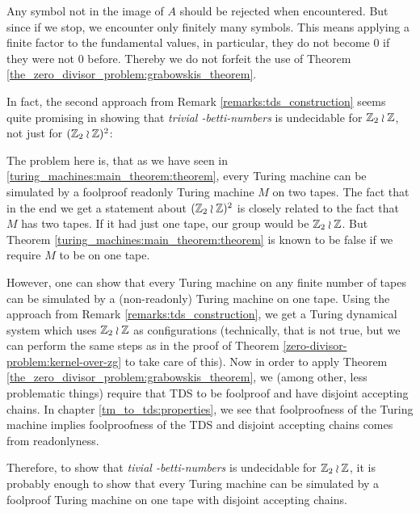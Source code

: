 \begin{Remark}
	Any symbol not in the image of $A$ should be rejected when encountered.
	But since if we stop, we encounter only finitely many symbols.
	This means applying a finite factor to the fundamental values, in particular, they do not become $0$ if they were not $0$ before.
	Thereby we do not forfeit the use of Theorem \ref{the_zero_divisor_problem:grabowskis_theorem}.
\end{Remark}

\begin{Remark}
	In fact, the second approach from Remark \ref{remarks:tds_construction} seems quite promising in showing that \emph{trivial \ltwo-betti-numbers} is undecidable for $\mathbb{Z}_2 \wr \mathbb{Z}$, not just for $(\mathbb{Z}_2 \wr \mathbb{Z})^2$:

	The problem here is, that as we have seen in \ref{turing_machines:main_theorem:theorem}, every Turing machine can be simulated by a foolproof readonly Turing machine $M$ on two tapes.
	The fact that in the end we get a statement about $(\mathbb{Z}_2 \wr \mathbb{Z})^2$ is closely related to the fact that $M$ has two tapes.
	If it had just one tape, our group would be $\mathbb{Z}_2 \wr \mathbb{Z}$.
	But Theorem \ref{turing_machines:main_theorem:theorem} is known to be false if we require $M$ to be on one tape.

	However, one can show that every Turing machine on any finite number of tapes can be simulated by a (non-readonly) Turing machine on one tape.
	Using the approach from Remark \ref{remarks:tds_construction}, we get a Turing dynamical system which uses $\mathbb{Z}_2 \wr \mathbb{Z}$ as configurations (technically, that is not true, but we can perform the same steps as in the proof of Theorem \ref{zero-divisor-problem:kernel-over-zg} to take care of this).
	Now in order to apply Theorem \ref{the_zero_divisor_problem:grabowskis_theorem}, we (among other, less problematic things) require that TDS to be foolproof and have disjoint accepting chains.
	In chapter \ref{tm_to_tds:properties}, we see that foolproofness of the Turing machine implies foolproofness of the TDS and disjoint accepting chains comes from readonlyness.

	Therefore, to show that \emph{tivial \ltwo-betti-numbers} is undecidable for $\mathbb{Z}_2 \wr \mathbb{Z}$, it is probably enough to show that every Turing machine can be simulated by a foolproof Turing machine on one tape with disjoint accepting chains.


\end{Remark}
